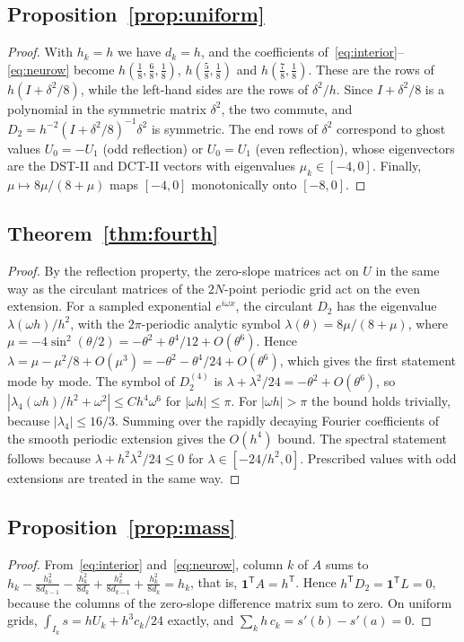 \documentclass[preprint,12pt]{elsarticle}
\theoremstyle{remark}
\begin{document}
\subsection{Proposition~\ref{prop:uniform}}\label{app:uniform}
\begin{proof}
With $h_k=h$ we have $d_k=h$, and the coefficients of~\eqref{eq:interior}--\eqref{eq:neurow} become
$h(\frac18,\frac68,\frac18)$, $h(\frac58,\frac18)$ and $h(\frac78,\frac18)$. These are the rows of
$h(I+\delta^2/8)$, while the left-hand sides are the rows of $\delta^2/h$. Since $I+\delta^2/8$ is a
polynomial in the symmetric matrix $\delta^2$, the two commute, and $D_2=h^{-2}(I+\delta^2/8)^{-1}\delta^2$ is
symmetric. The end rows of $\delta^2$ correspond to ghost values $U_0=-U_1$ (odd reflection) or $U_0=U_1$
(even reflection), whose eigenvectors are the DST-II and DCT-II vectors with eigenvalues $\mu_k\in[-4,0]$.
Finally, $\mu\mapsto8\mu/(8+\mu)$ maps $[-4,0]$ monotonically onto $[-8,0]$.
\end{proof}

\subsection{Theorem~\ref{thm:fourth}}\label{app:fourth}
\begin{proof}
By the reflection property, the zero-slope matrices act on $U$ in the same way as the circulant matrices
of the $2N$-point periodic grid act on the even extension. For a sampled exponential $e^{i\omega x}$, the
circulant $D_2$ has the eigenvalue $\lambda(\omega h)/h^2$, with the $2\pi$-periodic analytic symbol
$\lambda(\theta)=8\mu/(8+\mu)$, where $\mu=-4\sin^2(\theta/2)=-\theta^2+\theta^4/12+O(\theta^6)$. Hence
$\lambda=\mu-\mu^2/8+O(\mu^3)=-\theta^2-\theta^4/24+O(\theta^6)$, which gives the first statement mode by
mode. The symbol of $D_2^{(4)}$ is $\lambda+\lambda^2/24=-\theta^2+O(\theta^6)$, so
$|\lambda_4(\omega h)/h^2+\omega^2|\le Ch^4\omega^6$ for $|\omega h|\le\pi$. For $|\omega h|>\pi$ the bound
holds trivially, because $|\lambda_4|\le16/3$. Summing over the rapidly decaying Fourier coefficients of
the smooth periodic extension gives the $O(h^4)$ bound. The spectral statement follows because
$\lambda+h^2\lambda^2/24\le0$ for $\lambda\in[-24/h^2,0]$. Prescribed values with odd extensions are
treated in the same way.
\end{proof}

\subsection{Proposition~\ref{prop:mass}}\label{app:mass}
\begin{proof}
From~\eqref{eq:interior} and~\eqref{eq:neurow}, column $k$ of $A$ sums to
$h_k-\frac{h_k^2}{8d_{k-1}}-\frac{h_k^2}{8d_k}+\frac{h_k^2}{8d_{k-1}}+\frac{h_k^2}{8d_k}=h_k$, that is,
$\mathbf 1^{\mathsf T}A=h^{\mathsf T}$. Hence $h^{\mathsf T}D_2=\mathbf 1^{\mathsf T}L=0$, because the columns of
the zero-slope difference matrix sum to zero. On uniform grids, $\int_{I_k}s=hU_k+h^3c_k/24$ exactly, and
$\sum_kh\,c_k=s'(b)-s'(a)=0$.
\end{proof}
\end{document}
